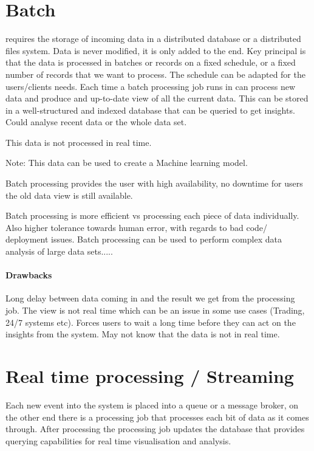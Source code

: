 \documentclass[a4paper, 11pt]{book}
\begin{document}
{    \section{Batch}
    requires the storage of incoming data in a distributed database or a distributed files system.
    Data is never modified, it is only added to the end.
    Key principal is that the data is processed in batches or records on a fixed schedule, or a fixed number of records that we want to process.
    The schedule can be adapted for the users/clients needs.
    Each time a batch processing job runs in can process new data and produce and up-to-date view of all the current data.
    This can be stored in a well-structured and indexed database that can be queried to get insights.
    Could analyse recent data or the whole data set.

    This data is not processed in real time.

    Note: This data can be used to create a Machine learning model.

    Batch processing provides the user with high availability, no downtime for users the old data view is still available.

    Batch processing is more efficient vs processing each piece of data individually. Also higher tolerance towards human error, with regards to bad code/ deployment issues.
    Batch processing can be used to perform complex data analysis of large data sets.....

    \paragraph{Drawbacks}
    Long delay between data coming in and the result we get from the processing job.
    The view is not real time which can be an issue in some use cases (Trading, 24/7 systems etc).
    Forces users to wait a long time before they can act on the insights from the system.
    May not know that the data is not in real time.


    \section{Real time processing / Streaming}
    Each new event into the system is placed into a queue or a message broker, on the other end there is a processing job that processes each bit of data as it comes through.
    After processing the processing job updates the database that provides querying capabilities for real time visualisation and analysis.

}
\end{document}
